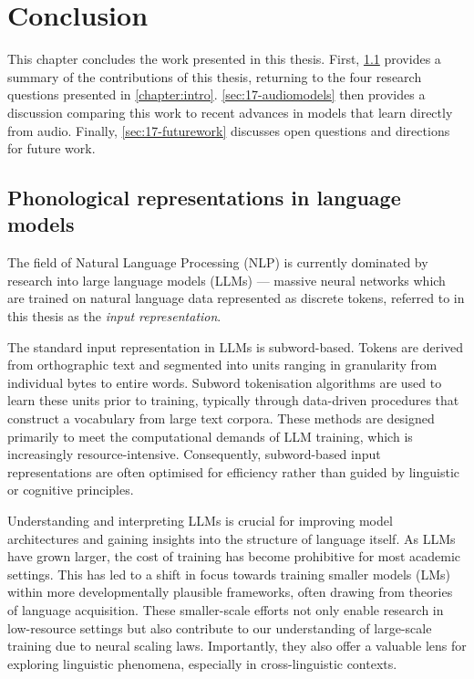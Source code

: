 \chapter{Conclusion}\label{chapter:conclusion}

This chapter concludes the work presented in this thesis. First, \cref{sec:17-summary} provides a summary of the contributions of this thesis, returning to the four research questions presented in \cref{chapter:intro}. \cref{sec:17-audiomodels} then provides a discussion comparing this work to recent advances in models that learn directly from audio. Finally, \cref{sec:17-futurework} discusses open questions and directions for future work.

\section{Phonological representations in language models}
\label{sec:17-summary}


The field of Natural Language Processing (NLP) is currently dominated by research into large language models (LLMs) --- massive neural networks which are trained on natural language data represented as discrete tokens, referred to in this thesis as the \emph{input representation}.

The standard input representation in LLMs is subword-based. Tokens are derived from orthographic text and segmented into units ranging in granularity from individual bytes to entire words. Subword tokenisation algorithms are used to learn these units prior to training, typically through data-driven procedures that construct a vocabulary from large text corpora. These methods are designed primarily to meet the computational demands of LLM training, which is increasingly resource-intensive. Consequently, subword-based input representations are often optimised for efficiency rather than guided by linguistic or cognitive principles.

Understanding and interpreting LLMs is crucial for improving model architectures and gaining insights into the structure of language itself. As LLMs have grown larger, the cost of training has become prohibitive for most academic settings. This has led to a shift in focus towards training smaller models (LMs) within more developmentally plausible frameworks, often drawing from theories of language acquisition. These smaller-scale efforts not only enable research in low-resource settings but also contribute to our understanding of large-scale training due to neural scaling laws. Importantly, they also offer a valuable lens for exploring linguistic phenomena, especially in cross-linguistic contexts.

